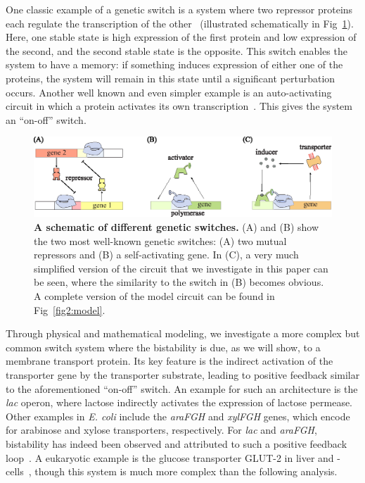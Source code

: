 \documentclass[10pt,letterpaper]{article}
\begin{document}
One classic example of a genetic switch is a system where two repressor
proteins each regulate the transcription of the
other~\cite{Jacob1961,Gardner2000} (illustrated schematically in
Fig~\ref{fig1:switches}). Here, one stable state is high expression of
the first protein and low expression of the second,
and the second stable state is the opposite. This
switch enables the system to have a memory: if something induces expression
of either one of the proteins, the system will remain in this state until a
significant perturbation occurs. Another well known and even simpler example
is an auto-activating circuit in which a protein activates its own
transcription~\cite{Wolf1998}. This gives the system an ``on-off'' switch.

\begin{figure}%
	\centering
	\includegraphics{media/Circuits.eps}
	\caption{{\bf A schematic of different genetic switches.}
	(A) and (B) show the two most well-known genetic switches:
	(A) two mutual repressors and (B) a self-activating gene.
	In (C), a very much simplified version of the
	circuit that we investigate in this paper can be seen, where the
	similarity to the switch in (B) becomes obvious. A complete version of
	the model circuit can be found in Fig~\ref{fig2:model}.}
	\label{fig1:switches}
\end{figure}

Through physical and mathematical modeling, we investigate a more complex
but common switch system where the bistability is due, as we will show, to a
membrane transport protein. Its key feature is the indirect activation of
the transporter gene by the transporter substrate, leading to positive
feedback similar to the aforementioned ``on-off'' switch. An example for
such an architecture is the \emph{lac} operon, where lactose indirectly
activates the expression of lactose permease. Other examples in \emph{E.
coli} include the \emph{araFGH} and \emph{xylFGH} genes, which encode for
arabinose and xylose transporters, respectively. For \emph{lac} and
\emph{araFGH}, bistability has indeed been observed and attributed to such a
positive feedback
loop~\cite{Novick1957,Narang2008,Choi2008,Ozbudak2004,Fritz2014,Jenkins2017,Siegele1997}.
A eukaryotic example is the glucose transporter GLUT-2 in liver and
\textbeta-cells~\cite{Bae2010,Tiedge1991}, though this system is much more
complex than the following analysis. 
\end{document}
